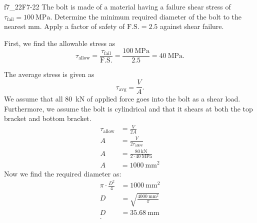 
\begin{problemwithimage}{f7_22}{F7-22}
  The bolt is made of a material having a failure shear stress of $\tau_{\mathrm{fail}} = \qty{100}{\MPa}$.
  Determine the minimum required diameter of the bolt to the nearest \unit{\mm}.
  Apply a factor of safety of $\mathrm{F.S.} = \num{2,5}$ against shear failure.
\end{problemwithimage}

\begin{derivation}
  First, we find the allowable stress as
  \begin{equation*}
    \tau_{\mathrm{allow}} = \frac{\tau_{\mathrm{fail}}}{\mathrm{F.S.}} = \frac{\qty{100}{\MPa} }{\num{2.5} } = \qty{40}{\MPa} 
  .\end{equation*}
  
  The average stress is given as
  \begin{equation*}
    \tau_{\mathrm{avg}} = \frac{V}{A}
  .\end{equation*}
  We assume that all \qty{80}{\kN} of applied force goes into the bolt as a shear load.
  Furthermore, we assume the bolt is cylindrical and that it shears at both the top bracket and bottom bracket.
  \begin{align*}
    \tau_{\mathrm{allow}} &= \frac{V}{2A} \\
    A &= \frac{V}{2\tau_{\mathrm{allow}}} \\
    A &= \frac{\qty{80}{\kN} }{2 \cdot \qty{40}{\MPa} } \\
    A &= \qty{1000}{\mm^2}
  \end{align*}
  Now we find the required diameter as:
  \begin{align*}
    \pi \cdot \frac{D^2}{4} &= \qty{1000}{\mm^2} \\
    D &= \sqrt{\frac{\qty{4000}{\mm^2} }{\pi}} \\
    D &= \qty{35,68}{\mm}\\
  .\end{align*}
\end{derivation}

